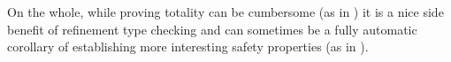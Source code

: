 
On the whole, while proving totality can be cumbersome 
(as in \lbhscolour) it is a nice side benefit of refinement
type checking and can sometimes be a fully automatic corollary
of establishing more interesting safety properties (as in \lbmap).
